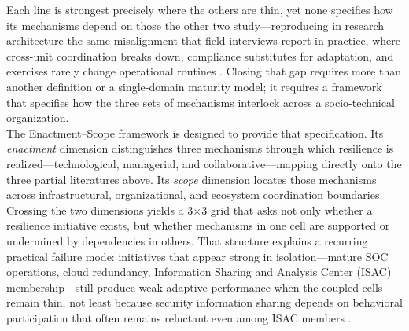 Each line is strongest precisely where the others are thin, yet none specifies how its mechanisms depend on those the other two study---reproducing in research architecture the same misalignment that field interviews report in practice, where cross-unit coordination breaks down, compliance substitutes for adaptation, and exercises rarely change operational routines \autocite{rota2024}. Closing that gap requires more than another definition or a single-domain maturity model; it requires a framework that specifies how the three sets of mechanisms interlock across a socio-technical organization.\\

The Enactment--Scope framework is designed to provide that specification. Its \emph{enactment} dimension distinguishes three mechanisms through which resilience is realized---technological, managerial, and collaborative---mapping directly onto the three partial literatures above. Its \emph{scope} dimension locates those mechanisms across infrastructural, organizational, and ecosystem coordination boundaries. Crossing the two dimensions yields a 3$\times$3 grid that asks not only whether a resilience initiative exists, but whether mechanisms in one cell are supported or undermined by dependencies in others. That structure explains a recurring practical failure mode: initiatives that appear strong in isolation---mature SOC operations, cloud redundancy, Information Sharing and Analysis Center (ISAC) membership---still produce weak adaptive performance when the coupled cells remain thin, not least because security information sharing depends on behavioral participation that often remains reluctant even among ISAC members \autocite{skopik2016problem,mermoud2019share}.\\

